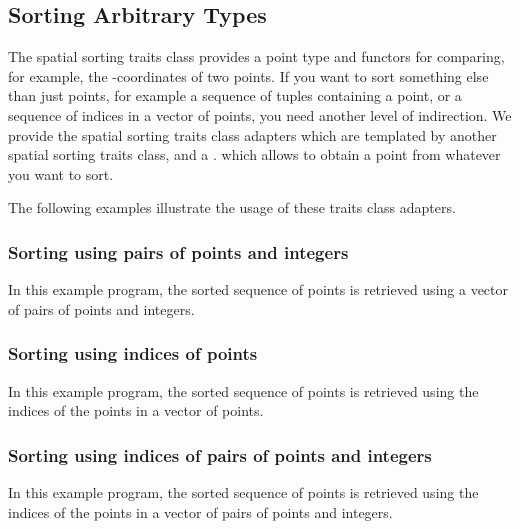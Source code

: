 \subsection{Sorting Arbitrary Types}
\label{sec:sort_any_type}
The spatial sorting traits class provides a point type and
functors for comparing, for example, the -coordinates
of two points.
%
If you want to sort something else than just points, for example
a sequence of tuples containing a point,  or a sequence of indices
in a vector of points, you need another level of indirection.
%
We provide the spatial sorting traits class adapters which are templated by
another spatial sorting traits class, and a 
.
which allows to obtain a point from whatever you want to sort. 

The following examples illustrate the usage of these traits class adapters.

\subsubsection{Sorting using pairs of points and integers}
\label{sec:sort_any_type_2}
In this example program, the sorted sequence of points is retrieved 
using a vector of pairs of points and integers.

\subsubsection{Sorting using indices of points}
In this example program, the sorted sequence of points is retrieved 
using the indices of the points in a vector of points.

\subsubsection{Sorting using indices of pairs of points and integers}
In this example program, the sorted sequence of points is retrieved 
using the indices of the points in a vector of pairs of points and integers.



